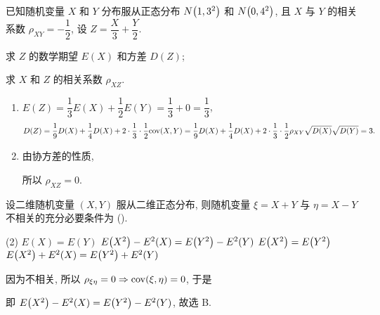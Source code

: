\begin{example}[1994 数一]
    已知随机变量 $X$ 和 $Y$ 分布服从正态分布 $N\qty(1,3^2)$ 和 $N\qty(0,4^2)$, 且 $X$ 与 $Y$ 的相关系数 $\rho_{XY}=-\dfrac{1}{2}$,
    设 $Z=\dfrac{X}{3}+\dfrac{Y}{2}$.\newline
    \begin{enumerate*}[label=(\arabic{*})]
        \item 求 $Z$ 的数学期望 $E(X)$ 和方差 $D(Z)$;
        \item 求 $X$ 和 $Z$ 的相关系数 $\rho_{XZ}.$
    \end{enumerate*}
\end{example}
\begin{solution}
    \begin{enumerate}[label=(\arabic{*})]
        \item $E(Z)=\dfrac{1}{3}E(X)+\dfrac{1}{2}E(Y)=\dfrac{1}{3}+0=\dfrac{1}{3}$,
              $$D(Z)=\dfrac{1}{9}D(X)+\dfrac{1}{4}D(X)+2\cdot\dfrac{1}{3}\cdot\dfrac{1}{2}\mathrm{cov}(X,Y)=\dfrac{1}{9}D(X)+\dfrac{1}{4}D(X)+2\cdot\dfrac{1}{3}\cdot\dfrac{1}{2}\rho_{XY}\sqrt{D(X)}\sqrt{D(Y)}=3.$$
        \item 由协方差的性质,
              所以 $\rho_{XZ}=0.$
    \end{enumerate}
\end{solution}

\begin{example}[2000 数一]
    设二维随机变量 $(X,Y)$ 服从二维正态分布, 则随机变量 $\xi=X+Y$ 与 $\eta=X-Y$ 不相关的充分必要条件为 (\quad).
    \begin{tasks}(2)
        \task $E(X)=E(Y)$
        \task $E\qty(X^2)-E^2(X)=E\qty(Y^2)-E^2(Y)$
        \task $E\qty(X^2)=E\qty(Y^2)$
        \task $E\qty(X^2)+E^2(X)=E\qty(Y^2)+E^2(Y)$
    \end{tasks}
\end{example}
\begin{solution}
    因为不相关, 所以 $\rho_{\xi\eta}=0\Rightarrow \mathrm{cov}(\xi,\eta)=0$, 于是
    即 $E\qty(X^2)-E^2(X)=E\qty(Y^2)-E^2(Y)$, 故选 B.
\end{solution}

